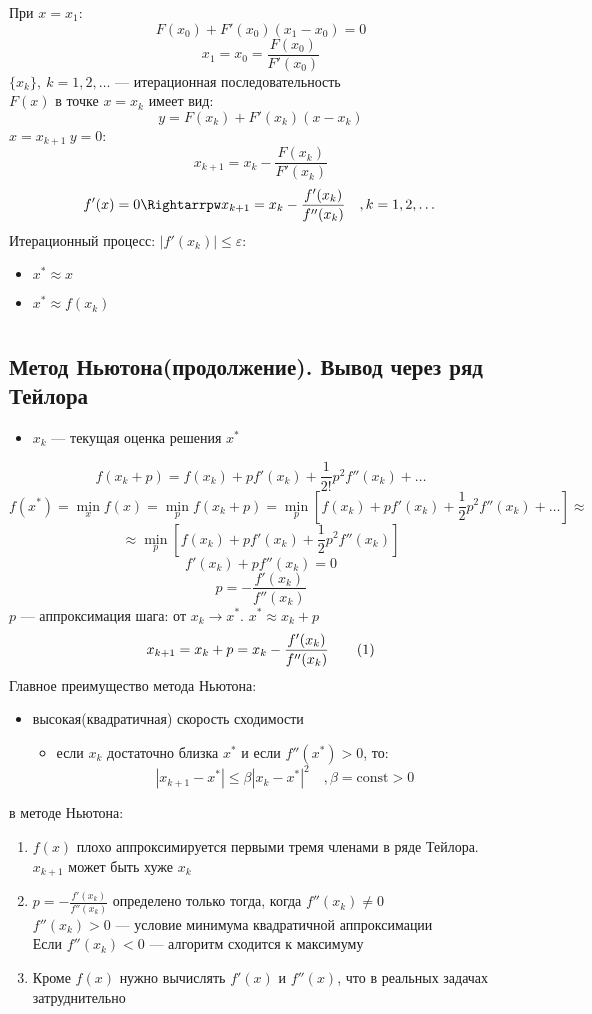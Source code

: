 \documentclass[oneside]{book}
\newcommand\addtag{\refstepcounter{equation}\tag{\theequation}}
\newcommand{\const}{\text{const}}
\theoremstyle{plain}
\theoremstyle{remark}
\theoremstyle{definition}
\begin{document}
При \(x = x_1\):
\[ F(x_0) + F'(x_0)(x_1 - x_0) = 0 \]
\[ x_1 = x_0 = \frac{F(x_0)}{F'(x_0)} \]
\(\{x_k\},\ k = 1, 2, \dots\) --- итерационная последовательность \\
\(F(x)\) в точке \(x = x_k\) имеет вид:
\[ y = F(x_k) + F'(x_k)(x - x_k) \]
\(x = x_{k + 1}\ y = 0\):
\[ x_{k+1} = x_k - \frac{F(x_k)}{F'(x_k)} \]
\[ f'(x) = 0 \Rightarrpw x_{k + 1} = x_k - \frac{f'(x_k)}{f''(x_k)}\quad,k=1,2,\dots \]
Итерационный процесс: \(|f'(x_k)| \le \varepsilon\):
\begin{itemize}
\item \(x^* \approx x\)
\item \(x^* \approx f(x_k)\)
\end{itemize}
\chapter{}
\label{sec:orgf789b09}
\section{Метод Ньютона(продолжение). Вывод через ряд Тейлора}
\label{sec:orgfb94b74}
\begin{itemize}
\item \(x_k\) --- текущая оценка решения \(x^*\)
\end{itemize}
\[ f(x_k + p) = f(x_k) + pf'(x_k) + \frac{1}{2!}p^2f''(x_k) + \dots \]
\[ f(x^*) = \min_x f(x) = \min_p f(x_k + p) = \min_p [ f(x_k) + pf'(x_k) + \frac{1}{2}p^2 f''(x_k)  + \dots ] \approx \]
\[ \approx \min_p[f(x_k) + pf'(x_k) + \frac{1}{2}p^2 f''(x_k)] \]
\[ f'(x_k) + pf''(x_k) = 0 \]
\[ p = -\frac{f'(x_k)}{f''(x_k)} \]
\(p\) --- аппроксимация шага: от \(x_k \to x^*\). \(x^* \approx x_k + p\)
\[ x_{k + 1} = x_k + p = x_k - \frac{f'(x_k)}{f''(x_k)} \label{nuton_1_5}\addtag \]
Главное преимущество метода Ньютона:
\begin{itemize}
\item высокая(квадратичная) скорость сходимости
\begin{itemize}
\item если \(x_k\) достаточно близка \(x^*\) и если \(f''(x^*) > 0\), то:
\[ |x_{k+1} - x^*| \le \beta|x_k - x^*|^2\quad, \beta = \const > 0 \]
\end{itemize}
\end{itemize}

 в методе Ньютона:
\begin{enumerate}
\item \(f(x)\) плохо аппроксимируется первыми тремя членами в ряде Тейлора. \(x_{k+1}\) может быть хуже \(x_k\)
\item \(p=-\frac{f'(x_k)}{f''(x_k)}\) определено только тогда, когда \(f''(x_k)\neq0\) \\
\(f''(x_k) > 0\) --- условие минимума квадратичной аппроксимации \\
Если \(f''(x_k) < 0\) --- алгоритм сходится к максимуму
\item Кроме \(f(x)\) нужно вычислять \(f'(x)\) и \(f''(x)\), что в реальных задачах затруднительно
\end{enumerate}
\end{document}
